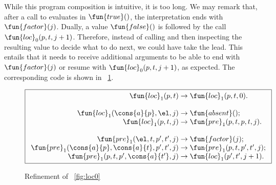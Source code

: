 While this program composition is intuitive, it is too long. We may
remark that, after a call to 
evaluates in \(\fun{true}()\), the interpretation ends with
\(\fun{factor}(j)\). Dually, a value \(\fun{false}()\) is followed by
the call
\(\fun{loc}_0(p,t,j+1)\). Therefore,
instead of calling  and then inspecting the resulting value
to decide what to do next, we could have  take the
lead. This entails that it needs to receive additional arguments to be
able to end with \(\fun{factor}(j)\) or resume with
\(\fun{loc}_0(p,t,j+1)\), as expected. The corresponding code is shown
in \fig~\ref{fig:loc1}.
\begin{figure}[t]
\begin{equation*}
\boxed{%
\begin{array}{r@{\;}l@{\;}l}
\fun{loc}_1(p,t)   & \rightarrow & \fun{loc}_1(p,t,0).\\
\\
\fun{loc}_1(\cons{a}{p},\el,j) & \rightarrow & \fun{absent}();\\
\fun{loc}_1(p,t,j) & \rightarrow & \fun{pre}_1(p,t,p,t,j).\\
\\
\fun{pre}_1(\el,t,p',t',j) & \rightarrow & \fun{factor}(j);\\
\fun{pre}_1(\cons{a}{p},\cons{a}{t},p',t',j)
                   & \rightarrow & \fun{pre}_1(p,t,p',t',j);\\
\fun{pre}_1(p,t,p',\cons{a}{t'},j) & \rightarrow & \fun{loc}_1(p',t',j+1).
\end{array}}
\end{equation*}
\caption{Refinement of \fig~\vref{fig:loc0}}
\label{fig:loc1}
\end{figure}

